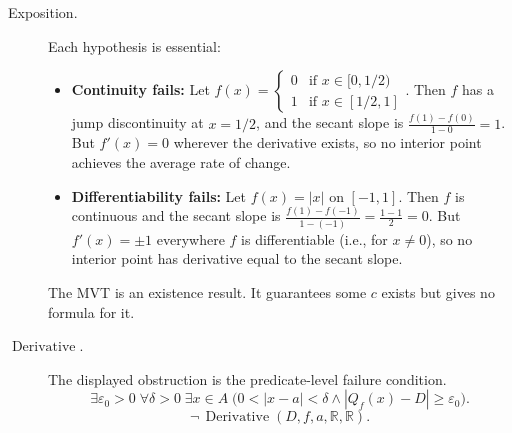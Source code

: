 \begin{remark*}
\begin{description}
  \item[Exposition.]
Each hypothesis is essential:
\begin{itemize}
  \item \textbf{Continuity fails:} Let $f(x) = \begin{cases} 0 & \text{if } x \in [0,1/2) \\ 1 & \text{if } x \in [1/2,1] \end{cases}$. Then $f$ has a jump discontinuity at $x = 1/2$, and the secant slope is $\tfrac{f(1)-f(0)}{1-0} = 1$. But $f'(x) = 0$ wherever the derivative exists, so no interior point achieves the average rate of change.
  \item \textbf{Differentiability fails:} Let $f(x) = |x|$ on $[-1,1]$. Then $f$ is continuous and the secant slope is $\tfrac{f(1)-f(-1)}{1-(-1)} = \tfrac{1-1}{2} = 0$. But $f'(x) = \pm 1$ everywhere $f$ is differentiable (i.e., for $x \ne 0$), so no interior point has derivative equal to the secant slope.
\end{itemize}
The MVT is an existence result. It guarantees some $c$ exists but gives no formula for it.


  \item[\(\operatorname{Derivative}.\)]
  The displayed obstruction is the predicate-level failure condition.
  \[
  \exists\varepsilon_0>0\;\forall\delta>0\;\exists x\in A\;\bigl(0<|x-a|<\delta\land |Q_f(x)-D|\ge\varepsilon_0\bigr).
  \]
  \[
  \neg\,\operatorname{Derivative}(D,f,a,\mathbb{R},\mathbb{R}).
  \]
\end{description}
\end{remark*}

